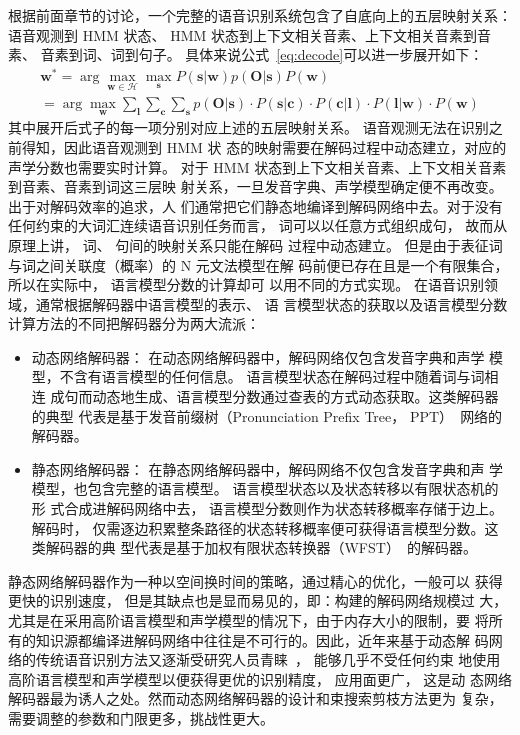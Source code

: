 根据前面章节的讨论，一个完整的语音识别系统包含了自底向上的五层映射关系：
语音观测到 HMM 状态、 HMM 状态到上下文相关音素、上下文相关音素到音素、
音素到词、词到句子。
具体来说公式~\ref{eq:decode}可以进一步展开如下：
\begin{equation}
 \begin{split}
\mathbf{w}^* = \arg \max_{\mathbf{w} \in \mathcal{H}} \max_{\mathbf{s}} P(\mathbf{s}|\mathbf{w})p(\mathbf{O}|\mathbf{s})P(\mathbf{w}) \\
= \arg \max_{\mathbf{w}} \sum_{\mathbf{l}} \sum_{\mathbf{c}} \sum_{\mathbf{s}}
p(\mathbf{O}|\mathbf{s}) \cdot
P(\mathbf{s}|\mathbf{c})\cdot P(\mathbf{c}|\mathbf{l})\cdot P(\mathbf{l}|\mathbf{w}) \cdot 
P(\mathbf{w})
 \end{split}
\end{equation}
其中展开后式子的每一项分别对应上述的五层映射关系。
语音观测无法在识别之前得知，因此语音观测到 HMM 状
态的映射需要在解码过程中动态建立，对应的声学分数也需要实时计算。
对于 HMM 状态到上下文相关音素、上下文相关音素到音素、音素到词这三层映
射关系，一旦发音字典、声学模型确定便不再改变。出于对解码效率的追求，人
们通常把它们静态地编译到解码网络中去。对于没有任何约束的大词汇连续语音识别任务而言，
词可以以任意方式组织成句， 故而从原理上讲， 词、 句间的映射关系只能在解码
过程中动态建立。 但是由于表征词与词之间关联度（概率）的 N 元文法模型在解
码前便已存在且是一个有限集合， 所以在实际中， 语言模型分数的计算却可
以用不同的方式实现。 在语音识别领域，通常根据解码器中语言模型的表示、 语
言模型状态的获取以及语言模型分数计算方法的不同把解码器分为两大流派：
\begin{itemize}
\item 动态网络解码器： 在动态网络解码器中，解码网络仅包含发音字典和声学
模型，不含有语言模型的任何信息。 语言模型状态在解码过程中随着词与词相连
成句而动态地生成、语言模型分数通过查表的方式动态获取。这类解码器的典型
代表是基于发音前缀树（Pronunciation Prefix Tree， PPT）~\cite{woodland1994large}网络的解码器。
\item 静态网络解码器： 在静态网络解码器中，解码网络不仅包含发音字典和声
学模型，也包含完整的语言模型。 语言模型状态以及状态转移以有限状态机的形
式合成进解码网络中去， 语言模型分数则作为状态转移概率存储于边上。解码时，
仅需逐边积累整条路径的状态转移概率便可获得语言模型分数。这类解码器的典
型代表是基于加权有限状态转换器（WFST）~\cite{mohri2002weighted}的解码器。
\end{itemize}

静态网络解码器作为一种以空间换时间的策略，通过精心的优化，一般可以
获得更快的识别速度， 但是其缺点也是显而易见的，即：构建的解码网络规模过
大，尤其是在采用高阶语言模型和声学模型的情况下，由于内存大小的限制，要
将所有的知识源都编译进解码网络中往往是不可行的。因此，近年来基于动态解
码网络的传统语音识别方法又逐渐受研究人员青睐~\cite{soltau2009dynamic,rybach2011comparative}， 能够几乎不受任何约束
地使用高阶语言模型和声学模型以便获得更优的识别精度， 应用面更广， 这是动
态网络解码器最为诱人之处。然而动态网络解码器的设计和束搜索剪枝方法更为
复杂，需要调整的参数和门限更多，挑战性更大。 

